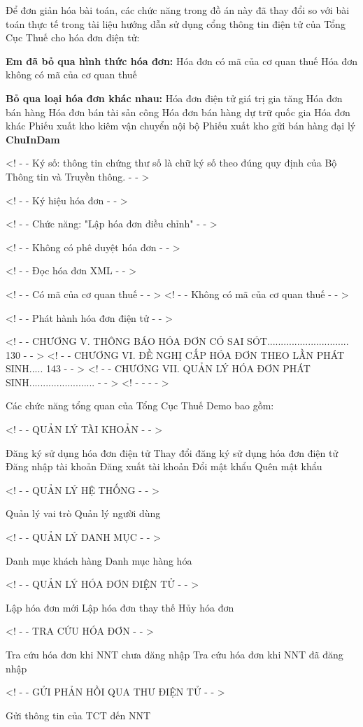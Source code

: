 Để đơn giản hóa bài toán, các chức năng trong đồ án này đã thay đổi so với bài toán thực tế trong tài liệu hướng dẫn sử dụng cổng thông tin điện tử của Tổng Cục Thuế cho hóa đơn điện tử:


 
\textbf{Em đã bỏ qua  hình thức hóa đơn: }  
Hóa đơn có mã của cơ quan thuế
Hóa đơn  không có mã của cơ quan thuế



\textbf{Bỏ qua  loại hóa đơn khác nhau:     }      
Hóa đơn điện tử giá trị gia tăng                       
Hóa đơn bán hàng                       
Hóa đơn bán tài sản công                       
Hóa đơn bán hàng dự trữ quốc gia                       
Hóa đơn khác                       
Phiếu xuất kho kiêm vận chuyển nội bộ                       
Phiếu xuất kho gửi bán hàng đại lý                       
\textbf{ChuInDam}      


<! - - Ký số: thông tin chứng thư số là chữ ký số theo đúng quy định của Bộ Thông tin và Truyền thông. - - >

<! - - Ký hiệu hóa đơn - - >

<! - - Chức năng: "Lập hóa đơn điều chỉnh" - - >

<! - - Không có phê duyệt hóa đơn - - >

<! - - Đọc hóa đơn XML - - >

<! - - Có mã của cơ quan thuế - - >
<! - - Không có mã của cơ quan thuế - - >

<! - - Phát hành hóa đơn điện tử - - >

<! - - CHƯƠNG V. THÔNG BÁO HÓA ĐƠN CÓ SAI SÓT.............................. 130 - - >
<! - - CHƯƠNG VI. ĐỀ NGHỊ CẤP HÓA ĐƠN THEO LẦN PHÁT SINH..... 143 - - >
<! - - CHƯƠNG VII. QUẢN LÝ HÓA ĐƠN PHÁT SINH........................ - - >
<! - - - - >

Các chức năng tổng quan của Tổng Cục Thuế Demo bao gồm:

<! - - QUẢN LÝ TÀI KHOẢN - - >

Đăng ký sử dụng hóa đơn điện tử
Thay đổi đăng ký sử dụng hóa đơn điện tử
Đăng nhập tài khoản
Đăng xuất tài khoản
Đổi mật khẩu
Quên mật khẩu

<! - - QUẢN LÝ HỆ THỐNG - - >

Quản lý vai trò
Quản lý người dùng

<! - - QUẢN LÝ DANH MỤC - - >

Danh mục khách hàng
Danh mục hàng hóa

<! - - QUẢN LÝ HÓA ĐƠN ĐIỆN TỬ - - >

Lập hóa đơn mới
Lập hóa đơn thay thế
Hủy hóa đơn

<! - - TRA CỨU HÓA ĐƠN - - >

Tra cứu hóa đơn khi NNT chưa đăng nhập
Tra cứu hóa đơn khi NNT đã đăng nhập

<! - - GỬI PHẢN HỒI QUA THƯ ĐIỆN TỬ - - >

Gửi thông tin của TCT đến NNT